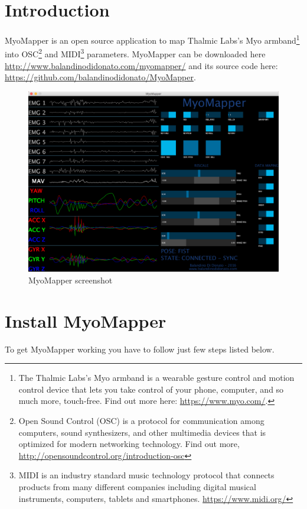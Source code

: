 \documentclass[12pt,a4paper]{article}
\begin{document}
\newpage
\section{Introduction}
MyoMapper is an open source application to map Thalmic Labs's Myo armband\footnote{The Thalmic Labs's Myo armband is a wearable gesture control and motion control device that lets you take control of your phone, computer, and so much more, touch-free. Find out more here: \url{https://www.myo.com/}.} into OSC\footnote{Open Sound Control (OSC) is a protocol for communication among computers, sound synthesizers, and other multimedia devices that is optimized for modern networking technology. Find out more, \url{http://opensoundcontrol.org/introduction-osc}} and MIDI\footnote{MIDI is an industry standard music technology protocol that connects products from many different companies including digital musical instruments, computers, tablets and smartphones. \url{https://www.midi.org/}} parameters. MyoMapper can be downloaded here \url{http://www.balandinodidonato.com/myomapper/} and its source code here: \url{https://github.com/balandinodidonato/MyoMapper}.

	\begin{figure}[h]
		\centering
		\includegraphics[width=1\linewidth]{../MyoMapper}
		\caption{MyoMapper screenshot}
		\label{fig:MyoMapperIntro}
	\end{figure}

\newpage
\section{Install MyoMapper}
To get MyoMapper working you have to follow just few steps listed below.
\end{document}
